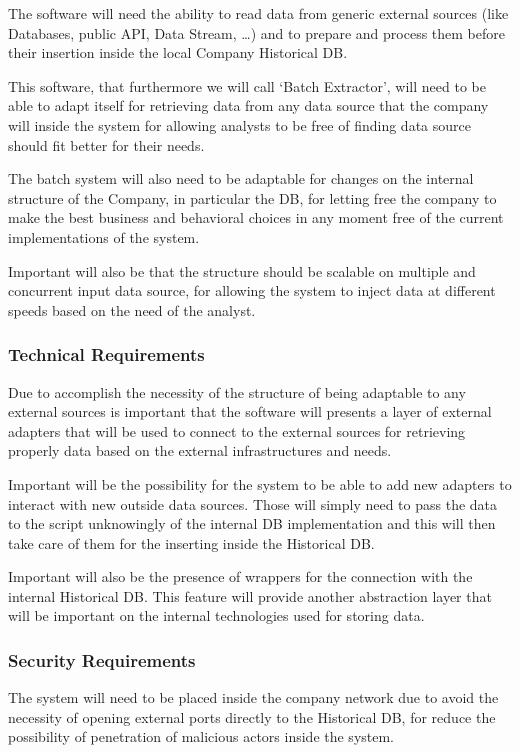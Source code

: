 The software will need the ability to read data from generic external sources (like Databases, public API, Data Stream, …) and to prepare and process them before their insertion inside the local Company Historical DB.

This software, that furthermore we will call ‘Batch Extractor’, will need to be able to adapt itself for retrieving data from any data source that the company will inside the system for allowing analysts to be free of finding data source should fit better for their needs.

The batch system will also need to be adaptable for changes on the internal structure of the Company, in particular the DB, for letting free the company to make the best business and behavioral choices in any moment free of the current implementations of the system.

Important will also be that the structure should be scalable on multiple and concurrent input data source, for allowing the system to inject data at different speeds based on the need of the analyst.

\subsubsection{Technical Requirements}

Due to accomplish the necessity of the structure of being adaptable to any external sources is important that the software will presents a layer of external adapters that will be used to connect to the external sources for retrieving properly data based on the external infrastructures and needs. 

Important will be the possibility for the system to be able to add new adapters to interact with new outside data sources. Those will simply need to pass the data to the script unknowingly of the internal DB implementation and this will then take care of them for the inserting inside the Historical DB.

Important will also be the presence of wrappers for the connection with the internal Historical DB. 
This feature will provide another abstraction layer that will be important on the internal technologies used for storing data.

\subsubsection{Security Requirements}

The system will need to be placed inside the company network due to avoid the necessity of opening external ports directly to the Historical DB, for reduce the possibility of penetration of malicious actors inside the system.

